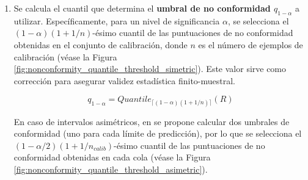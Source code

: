 \begin{enumerate}
    \item Se calcula el cuantil que determina el \textbf{umbral de no conformidad $q_{1-\alpha}$} a utilizar.
    Específicamente, para un nivel de significancia $\alpha$, se selecciona el $(1 - \alpha)(1 + 1/n)$-ésimo 
    cuantil de las puntuaciones de no conformidad obtenidas en el conjunto de calibración, donde $n$ es el 
    número de ejemplos de calibración
    (véase la Figura \ref{fig:nonconformity_quantile_threshold_simetric}). 
    Este valor sirve como corrección para asegurar validez estadística finito-muestral.

    $$
    q_{1-\alpha} = Quantile_{ \lceil  (1-\alpha) (1 + 1/n)  \rceil } ( R )
    $$

    En caso de intervalos asimétricos, en \cite{linusson2014} se propone calcular dos umbrales de conformidad 
    (uno para cada límite de predicción), por lo que se selecciona el $(1 - \alpha/2)(1 + 1/n_{calib})$-ésimo 
    cuantil de las puntuaciones de no conformidad obtenidas en cada cola
    (véase la Figura \ref{fig:nonconformity_quantile_threshold_asimetric}).

    \begin{figure}[h]
        \centering


\end{figure}
\end{enumerate}
